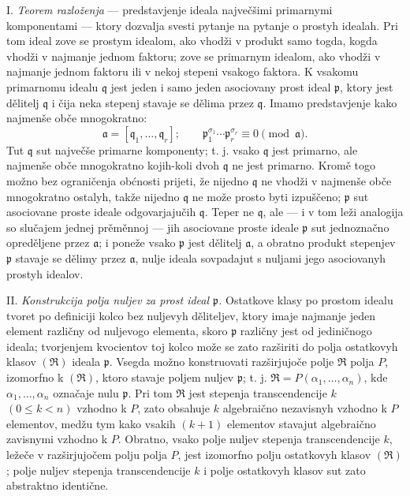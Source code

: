 \documentclass[11pt]{article}
\providecommand{\fraka}{\mathfrak a}
\providecommand{\frakp}{\mathfrak p}
\providecommand{\frakq}{\mathfrak q}
\providecommand{\frakR}{\mathfrak R}
\begin{document}
\noindent I. \emph{Teorem razloženja} --- predstavjenje ideala največšimi primarnymi komponentami --- ktory dozvalja svesti pytanje na pytanje o prostyh idealah. Pri tom ideal zove se prostym idealom, ako vhodži v produkt samo togda, kogda vhodži v najmanje jednom faktoru; zove se primarnym idealom, ako vhodži v najmanje jednom faktoru ili v nekoj stepeni vsakogo faktora. K vsakomu primarnomu idealu $\frakq$ jest jeden i samo jeden asociovany prost ideal $\frakp$, ktory jest dělitelj $\frakq$ i čija neka stepenj stavaje se dělima przez $\frakq$. Imamo predstavjenje kako najmenše obče mnogokratno:
\[
 \fraka=[\frakq_1,\ldots,\frakq_r];\qquad
 \frakp_1^{\sigma_1}\cdots \frakp_r^{\sigma_r}\equiv 0\pmod{\fraka}.
\]
Tut $\frakq$ sut največše primarne komponenty; t. j. vsako $\frakq$ jest primarno, ale najmenše obče mnogokratno kojih-koli dvoh $\frakq$ ne jest primarno. Kromě togo možno bez ograničenja obćnosti prijeti, že nijedno $\frakq$ ne vhodži v najmenše obče mnogokratno ostalyh, takže nijedno $\frakq$ ne može prosto byti izpuščeno; $\frakp$ sut asociovane proste ideale odgovarjajučih $\frakq$. Teper ne $\frakq$, ale --- i v tom leži analogija so slučajem jednej prěměnnoj --- jih asociovane proste ideale $\frakp$ sut jednoznačno opreděljene przez $\fraka$; i poneže vsako $\frakp$ jest dělitelj $\fraka$, a obratno produkt stepenjev $\frakp$ stavaje se dělimy przez $\fraka$, nulje ideala sovpadajut s nuljami jego asociovanyh prostyh idealov.

\noindent II. \emph{Konstrukcija polja nuljev za prost ideal $\frakp$.} Ostatkove klasy po prostom idealu tvoret po definiciji kolco bez nuljevyh děliteljev, ktory imaje najmanje jeden element različny od nuljevogo elementa, skoro $\frakp$ različny jest od jediničnogo ideala; tvorjenjem kvocientov toj kolco može se zato razširiti do polja ostatkovyh klasov $(\frakR)$ ideala $\frakp$. Vsegda možno konstruovati razširjujoče polje $\frakR$ polja $P$, izomorfno k $(\frakR)$, ktoro stavaje poljem nuljev $\frakp$; t. j. $\frakR=P(\alpha_1,\ldots,\alpha_n)$, kde $\alpha_1,\ldots,\alpha_n$ označaje nulu $\frakp$. Pri tom $\frakR$ jest stepenja transcendencije $k$ $(0\leq k<n)$ vzhodno k $P$, zato obsahuje $k$ algebraično nezavisnyh vzhodno k $P$ elementov, medžu tym kako vsakih $(k+1)$ elementov stavajut algebraično zavisnymi vzhodno k $P$. Obratno, vsako polje nuljev stepenja transcendencije $k$, ležeče v razširjujočem polju polja $P$, jest izomorfno polju ostatkovyh klasov $(\frakR)$; polje nuljev stepenja transcendencije $k$ i polje ostatkovyh klasov sut zato abstraktno identične.
\end{document}
